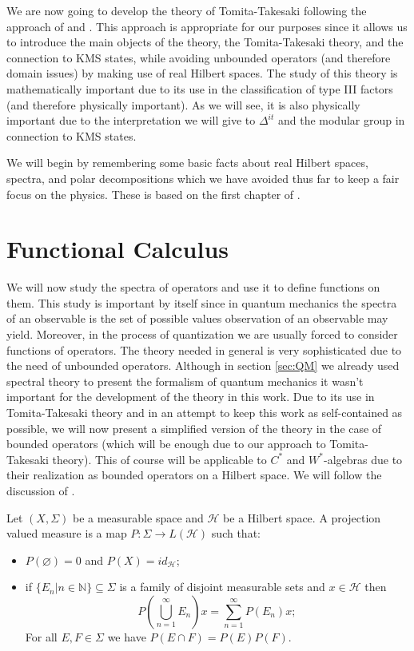 We are now going to develop the theory of Tomita-Takesaki following the approach of \cite{Duvenhage1999} and \cite{Rieffel1977}. This approach is appropriate for our purposes since it allows us to introduce the main objects of the theory, the Tomita-Takesaki theory, and the connection to KMS states, while avoiding unbounded operators (and therefore domain issues) by making use of real Hilbert spaces. The study of this theory is mathematically important due to its use in the classification of type III factors (and therefore physically important). As we will see, it is also physically important due to the interpretation we will give to $\Delta^{it}$ and the modular group in connection to KMS states.

We will begin by remembering some basic facts about real Hilbert spaces, spectra, and polar decompositions which we have avoided thus far to keep a fair focus on the physics. These is based on the first chapter of \cite{Duvenhage1999}.

\section{Functional Calculus}

We will now study the spectra of operators and use it to define functions on them. This study is important by itself since in quantum mechanics the spectra of an observable is the set of possible values observation of an observable may yield. Moreover, in the process of quantization we are usually forced to consider functions of operators. The theory needed in general is very sophisticated due to the need of unbounded operators. Although in section \ref{sec:QM} we already used spectral theory to present the formalism of quantum mechanics it wasn't important for the development of the theory in this work. Due to its use in Tomita-Takesaki theory and in an attempt to keep this work as self-contained as possible, we will now present a simplified version of the theory in the case of bounded operators (which will be enough due to our approach to Tomita-Takesaki theory). This of course will be applicable to $C^*$ and $W^*$-algebras due to their realization as bounded operators on a Hilbert space. We will follow the discussion of \cite{Hall2013}.

\begin{definition}
Let $(X,\Sigma)$ be a measurable space and $\mathcal{H}$ be a Hilbert space. A projection valued measure is a map $P:\Sigma\rightarrow L(\mathcal{H})$ such that:
\begin{itemize}
\item $P(\varnothing) = 0$ and $P(X)=id_{\mathcal{H}}$;
\item if $\{E_n|n\in\mathbb{N}\}\subseteq\Sigma$ is a family of disjoint measurable sets and $x\in\mathcal{H}$ then
\begin{equation}
P\left(\bigcup_{n=1}^\infty E_n\right)x=\sum_{n=1}^\infty P(E_n)x;
\end{equation}
For all $E,F\in\Sigma$ we have $P(E\cap F)=P(E)P(F)$.
\end{itemize}
\end{definition}

